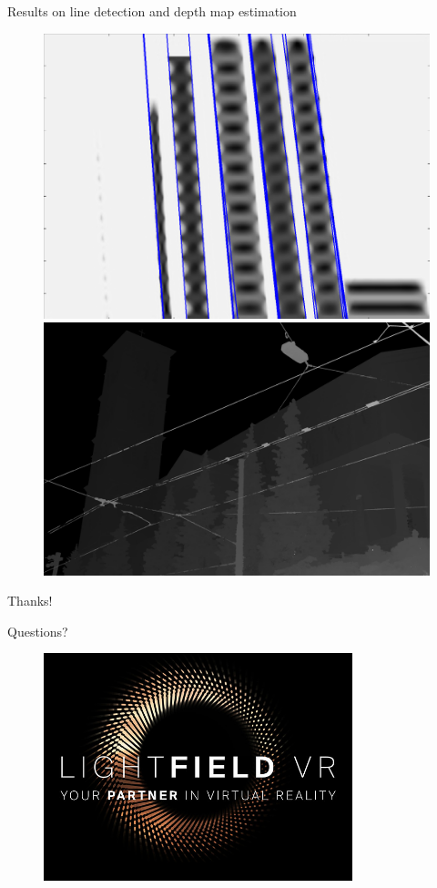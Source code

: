 \begin{frame}{Results on line detection and depth map estimation}
\begin{figure}[!tbp]
  \centering
  \begin{minipage}[b]{0.40\textwidth}
    \includegraphics[width=\textwidth]{./images/EPI-lines.png}
  \end{minipage}
	\pause
  \begin{minipage}[b]{0.40\textwidth}
    \includegraphics[width=\textwidth]{./images/dmap.png}
  \end{minipage}
\end{figure}
\end{frame}


\begin{frame}{Thanks!}
\begin{center}
\Large{Questions?}
\end{center}
\begin{figure}[h!]
\centering
\includegraphics[width=0.8\textwidth]{./images/lf-vr.jpg}
\end{figure}
\end{frame}

